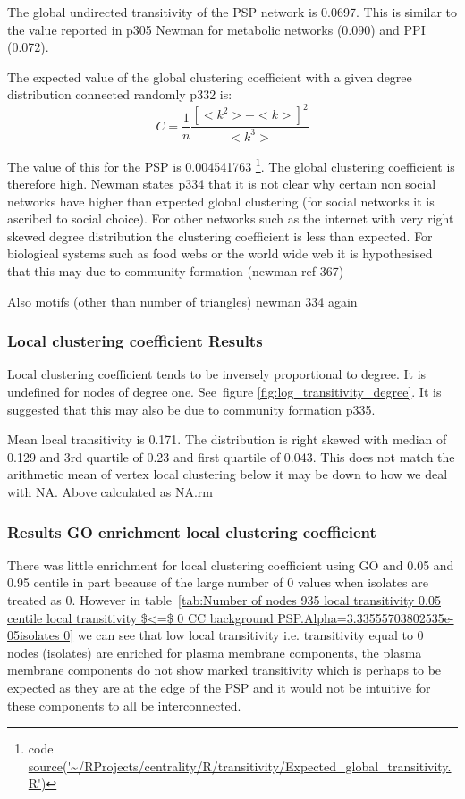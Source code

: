 The global undirected transitivity of the PSP network is 0.0697. This is similar to the value reported in p305 Newman \cite{newman2018networks} for metabolic networks (0.090) and PPI (0.072).

The expected value of the global clustering coefficient with a given degree distribution connected randomly \cite{newman2018networks} p332 is:
\begin{equation}
    C=\frac{1}{n}\frac{[<k^2> - <k>]^2}{<k^3>}
\end{equation}

The value of this for the PSP is 0.004541763 \footnote{code \url{source('~/RProjects/centrality/R/transitivity/Expected_global_transitivity.R')}}. The global clustering coefficient is therefore high. Newman states p334 \cite{newman2018networks} that it is not clear why certain non social networks have higher than expected global clustering (for social networks it is ascribed to social choice). For other networks such as the internet with very right skewed degree distribution the clustering coefficient is less than expected. For biological systems such as food webs or the world wide web it is hypothesised that this may due to community formation (newman ref 367)

Also motifs (other than number of triangles) newman 334 again

\subsubsection{Local clustering coefficient Results}
Local clustering coefficient tends to be inversely proportional to degree. It is undefined for nodes of degree one. See~figure \ref{fig:log_transitivity_degree}. It is suggested that this may also be due to community formation \cite{newman2018networks} p335.

Mean local transitivity is 0.171. The distribution is right skewed with median of 0.129 and 3rd quartile of 0.23 and first quartile of 0.043. This does not match the arithmetic mean of vertex local clustering below it may be down to how we deal with NA. Above calculated as NA.rm
\subsubsection{Results GO enrichment local clustering coefficient}

There was little enrichment for local clustering coefficient using GO and 0.05 and 0.95 centile in part because of the large number of 0 values when isolates are treated as 0. However in table~\ref{tab:Number of nodes 935 local transitivity 0.05 centile  local transitivity $<=$ 0 CC background PSP.Alpha=3.33555703802535e-05isolates 0} we can see that low local transitivity i.e. transitivity equal to 0 nodes (isolates) are enriched for plasma membrane components, the plasma membrane components do not show marked transitivity which is perhaps to be expected as they are at the edge of the PSP and it would not be intuitive for these components to all be interconnected. 


